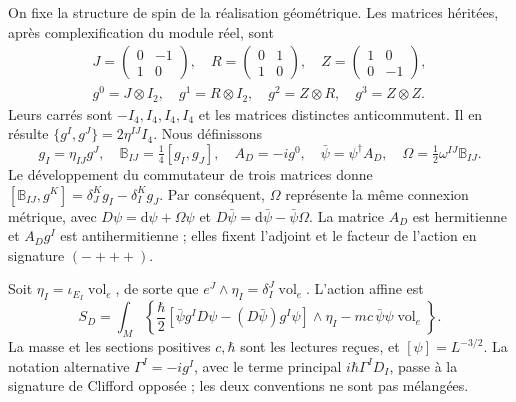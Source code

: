 On fixe la structure de spin de la réalisation géométrique. Les matrices héritées, après complexification du module réel, sont
\begin{equation}
 \begin{gathered}
 J=\begin{pmatrix}0&-1\\1&0\end{pmatrix},\quad
 R=\begin{pmatrix}0&1\\1&0\end{pmatrix},\quad
 Z=\begin{pmatrix}1&0\\0&-1\end{pmatrix},\\
 g^0=J\otimes I_2,\quad g^1=R\otimes I_2,\quad
 g^2=Z\otimes R,\quad g^3=Z\otimes Z .
 \end{gathered}
 \label{hmtcuatro:ant:clifford}
\end{equation}
Leurs carrés sont \(-I_4,I_4,I_4,I_4\) et les matrices distinctes anticommutent. Il en résulte \(\{g^I,g^J\}=2\eta^{IJ}I_4\). Nous définissons
\[
 g_I=\eta_{IJ}g^J,\quad
 \mathbb B_{IJ}=\tfrac14[g_I,g_J],\quad
 A_D=-ig^0,\quad \bar\psi=\psi^\dagger A_D,\quad
 \Omega=\tfrac12\omega^{IJ}\mathbb B_{IJ}.
\]
Le développement du commutateur de trois matrices donne \([\mathbb B_{IJ},g^K]=\delta_J^Kg_I-\delta_I^Kg_J\). Par conséquent, \(\Omega\) représente la même connexion métrique, avec \(D\psi=\mathrm d\psi+\Omega\psi\) et \(D\bar\psi=\mathrm d\bar\psi-\bar\psi\Omega\). La matrice \(A_D\) est hermitienne et \(A_Dg^I\) est antihermitienne ; elles fixent l’adjoint et le facteur de l’action en signature \((-+++)\).

Soit \(\eta_I=\iota_{E_I}\operatorname{vol}_e\), de sorte que \(e^J\wedge\eta_I=\delta_I^J\operatorname{vol}_e\). L’action affine est
\begin{equation}
 S_D=\int_M\left\{
 \frac{\hbar}{2}
 [\bar\psi g^ID\psi-(D\bar\psi)g^I\psi]\wedge\eta_I
 -mc\,\bar\psi\psi\operatorname{vol}_e\right\}.
 \label{hmtcuatro:ant:accion-dirac}
\end{equation}
La masse et les sections positives \(c,\hbar\) sont les lectures reçues, et \([\psi]=L^{-3/2}\). La notation alternative \(\Gamma^I=-ig^I\), avec le terme principal \(i\hbar\Gamma^ID_I\), passe à la signature de Clifford opposée ; les deux conventions ne sont pas mélangées.

